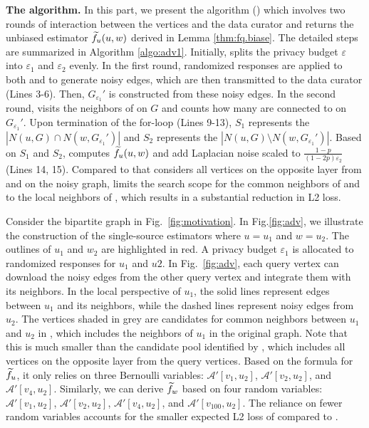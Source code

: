 \noindent
{\bf The \advss algorithm.} 
In this part, we present the \advsslong algorithm (\advss) which involves two rounds of interaction between the vertices and the data curator and returns the unbiased estimator $\widetilde{f}_u(u ,w)$ derived in Lemma \ref{thm:fq.biase}. The detailed steps are summarized in Algorithm \ref{algo:adv1}. 
Initially, \advss splits the privacy budget $\varepsilon$ into $\varepsilon_1$ and $\varepsilon_2$ evenly. 
In the first round, randomized responses are applied to both \vq and \vx to generate noisy edges, which are then transmitted to the data curator (Lines 3-6). Then, $G_{\varepsilon_1}'$ is constructed from these noisy edges. 
In the second round, \advss visits the neighbors of \vq on $G$ and counts how many are connected to \vx on $G_{\varepsilon_1}'$. 
Upon termination of the for-loop (Lines 9-13), $S_1$ represents the $|N(u, G) \cap N(w, G_{\varepsilon_1}') |$ and $S_2$ represents the $|N(u, G) \setminus N(w,G_{\varepsilon_1}') |$. 
Based on $S_1$ and $S_2$, \advss computes $\widetilde{f}_u(u, w)$ and add Laplacian noise scaled to $\frac{1-p}{(1-2p) \varepsilon_2}$ (Lines 14, 15). 
Compared to \bs that considers all vertices on the opposite layer from \vq and \vx on the noisy graph, \advss limits the search scope for the common neighbors of \vq and \vx to the local neighbors of \vq, which results in a substantial reduction in L2 loss. 

\begin{example}
Consider the bipartite graph in Fig.~\ref{fig:motivation}. 
In Fig.\ref{fig:adv}, we illustrate the construction of the single-source estimators where $u = u_1$ and $w = u_2$. 
The outlines of $u_1$ and $w_2$ are highlighted in red. 
A privacy budget $\varepsilon_1$ is allocated to randomized responses for $u_1$ and $u2$. 
In Fig.~\ref{fig:adv}, each query vertex can download the noisy edges from the other query vertex and integrate them with its neighbors. 
In the local perspective of $u_1$, the solid lines represent edges between $u_1$ and its neighbors, while the dashed lines represent noisy edges from $u_2$. 
The vertices shaded in grey are candidates for common neighbors between $u_1$ and $u_2$ in \advss, which includes the neighbors of $u_1$ in the original graph. 
Note that this is much smaller than the candidate pool identified by \bs, which includes all vertices on the opposite layer from the query vertices. 
Based on the formula for $\widetilde{f}_u$, it only relies on three Bernoulli variables: $\mathcal{A}'[v_1, u_2]$, $\mathcal{A}'[v_2, u_2]$, and $\mathcal{A}'[v_4, u_2]$. 
Similarly, we can derive $\widetilde{f}_w$ based on four random variables: $\mathcal{A}'[v_1, u_2]$, $\mathcal{A}'[v_2, u_2]$, $\mathcal{A}'[v_4, u_2]$, and $\mathcal{A}'[v_{100}, u_2]$. 
The reliance on fewer random variables accounts for the smaller expected L2 loss of \advss compared to \bs.
\end{example}





